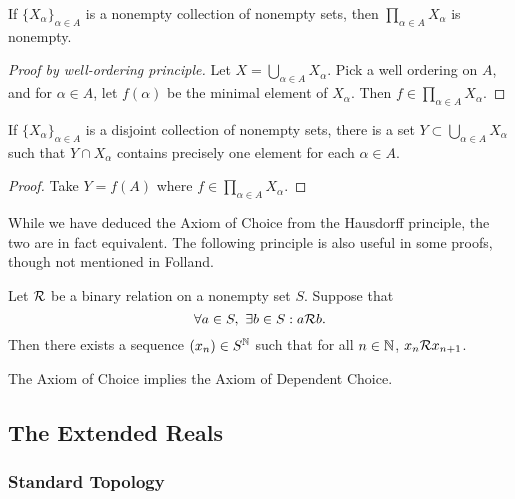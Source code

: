 \documentclass[12pt]{article} %
\begin{document}
\begin{principle}
    If $\{X_\alpha\}_{\alpha \in A}$ is a nonempty collection of nonempty sets, then $\prod_{\alpha \in A} X_\alpha$ is nonempty.
\end{principle}

\begin{proof}[Proof by well-ordering principle]
    Let $X = \bigcup_{\alpha \in A} X_\alpha$. Pick a well ordering on $A$, and for $\alpha \in A$, let $f(\alpha)$ be the minimal element of $X_\alpha$. Then $f \in \prod_{\alpha \in A} X_\alpha$.
\end{proof}

\begin{corollary}
    If $\{X_\alpha\}_{\alpha \in A}$ is a disjoint collection of nonempty sets, there is a set $Y \subset \bigcup_{\alpha \in A} X_\alpha$ such that $Y \cap X_\alpha$ contains precisely one element for each $\alpha \in A$.
\end{corollary}

\begin{proof}
    Take $Y = f(A)$ where $f \in \prod_{\alpha \in A} X_\alpha$.
\end{proof}

\noindent While we have deduced the Axiom of Choice from the Hausdorff principle, the two are in fact equivalent. The following principle is also useful in some proofs, though not mentioned in Folland.

\begin{principle}
    Let $\mathcal{R}$ be a binary relation on a nonempty set $S$. Suppose that \[\forall a \in S, \ \exists b \in S : a \mathcal{R} b.\] Then there exists a sequence $(x_n) \in S^{\mathbb{N}}$ such that for all $n \in \mathbb{N}$, $x_n \mathcal{R} x_{n+1}$.
\end{principle}

\begin{proposition}
    The Axiom of Choice implies the Axiom of Dependent Choice.
\end{proposition}

\subsection{The Extended Reals}

\subsubsection{Standard Topology}
\end{document}
